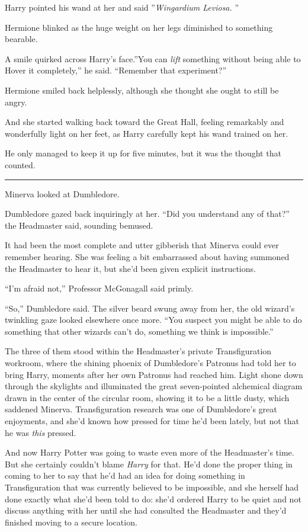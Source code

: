 Harry pointed his wand at her and said ''\emph{Wingardium Leviosa.} ''

Hermione blinked as the huge weight on her legs diminished to something
bearable.

A smile quirked across Harry's face.''You can \emph{lift} something
without being able to Hover it completely,'' he said. ``Remember that
experiment?''

Hermione smiled back helplessly, although she thought she ought to still
be angry.

And she started walking back toward the Great Hall, feeling remarkably
and wonderfully light on her feet, as Harry carefully kept his wand
trained on her.

He only managed to keep it up for five minutes, but it was the thought
that counted.

\begin{center}\rule{3in}{0.4pt}\end{center}

Minerva looked at Dumbledore.

Dumbledore gazed back inquiringly at her. ``Did you understand any of
that?'' the Headmaster said, sounding bemused.

It had been the most complete and utter gibberish that Minerva could
ever remember hearing. She was feeling a bit embarrassed about having
summoned the Headmaster to hear it, but she'd been given explicit
instructions.

``I'm afraid not,'' Professor McGonagall said primly.

``So,'' Dumbledore said. The silver beard swung away from her, the old
wizard's twinkling gaze looked elsewhere once more. ``You suspect you
might be able to do something that other wizards can't do, something we
think is impossible.''

The three of them stood within the Headmaster's private Transfiguration
workroom, where the shining phoenix of Dumbledore's Patronus had told
her to bring Harry, moments after her own Patronus had reached him.
Light shone down through the skylights and illuminated the great
seven-pointed alchemical diagram drawn in the center of the circular
room, showing it to be a little dusty, which saddened Minerva.
Transfiguration research was one of Dumbledore's great enjoyments, and
she'd known how pressed for time he'd been lately, but not that he was
\emph{this} pressed.

And now Harry Potter was going to waste even more of the Headmaster's
time. But she certainly couldn't blame \emph{Harry} for that. He'd done
the proper thing in coming to her to say that he'd had an idea for doing
something in Transfiguration that was currently believed to be
impossible, and she herself had done exactly what she'd been told to do:
she'd ordered Harry to be quiet and not discuss anything with her until
she had consulted the Headmaster and they'd finished moving to a secure
location.

